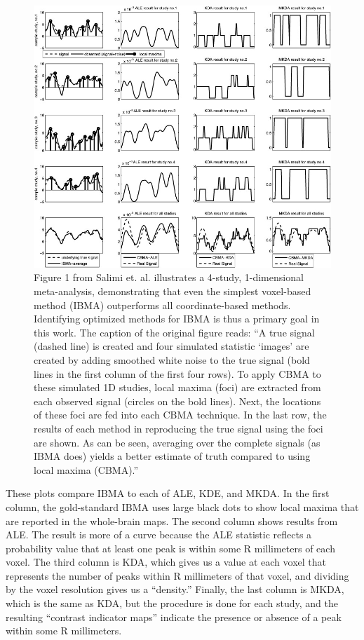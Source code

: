 \documentclass{report}
\begin{document}
\begin{figure}[ht!]
\begin{center}
\includegraphics[width=15cm]{images/figure12.jpg}
\end{center}
 \caption{\label{fig:12} Figure 1 from Salimi et. al. illustrates a 4-study, 1-dimensional meta-analysis, demonstrating that even the simplest voxel-based method (IBMA) outperforms all coordinate-based methods. Identifying optimized methods for IBMA is thus a primary goal in this work. The caption of the original figure reads: ``A true signal (dashed line) is created
and four simulated statistic `images' are created by adding smoothed
white noise to the true signal (bold lines in the first column of the
first four rows). To apply CBMA to these simulated 1D studies, local
maxima (foci) are extracted from each observed signal (circles on the
bold lines). Next, the locations of these foci are fed into each CBMA
technique. In the last row, the results of each method in reproducing
the true signal using the foci are shown. As can be seen, averaging over
the complete signals (as IBMA does) yields a better estimate of truth
compared to using local maxima (CBMA).''}
\end{figure}

These plots \cite{Salimi-Khorshidi2009-if} compare
IBMA to each of ALE, KDE, and MKDA. In the first column, the
gold-standard IBMA uses large black dots to show local maxima that are
reported in the whole-brain maps. The second column shows results from
ALE. The result is more of a curve because the ALE statistic reflects a
probability value that at least one peak is within some R millimeters of
each voxel. The third column is KDA, which gives us a value at each
voxel that represents the number of peaks within R millimeters of that
voxel, and dividing by the voxel resolution gives us a ``density.''
Finally, the last column is MKDA, which is the same as KDA, but the
procedure is done for each study, and the resulting ``contrast indicator
maps'' indicate the presence or absence of a peak within some R
millimeters.
\end{document}
